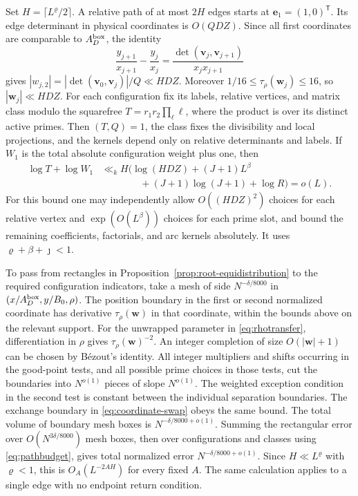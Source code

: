 \documentclass[11pt]{amsart}
\numberwithin{equation}{section}
\theoremstyle{remark}
\begin{document}
Set $H=\lceil L^\varrho/2\rceil$. A relative path of at most $2H$
edges starts at $\mathbf e_1=(1,0)^{\mathsf T}$. Its edge determinant
in physical coordinates is $O(QDZ)$. Since all first coordinates
are comparable to $A_D^{\rm box}$, the identity
\[
 \frac{y_{j+1}}{x_{j+1}}-\frac{y_j}{x_j}
 =\frac{\det(\mathbf v_j,\mathbf v_{j+1})}{x_jx_{j+1}}
\]
gives $|w_{j,2}|=|\det(\mathbf v_0,\mathbf v_j)|/Q\ll HDZ$.
Moreover $1/16\le\tau_\rho(\mathbf w_j)\le16$, so
$|\mathbf w_j|\ll HDZ$. For each configuration fix its labels,
relative vertices, and matrix class modulo the squarefree
$T=r_1r_2\prod_\ell\ell$, where the product is over its distinct
active primes. Then $(T,Q)=1$, the class fixes the divisibility and
local projections, and the kernels depend only on relative
determinants and labels. If $W_1$ is the total absolute configuration
weight plus one, then
\begin{equation}\label{eq:pathbudget}
 \begin{split}
 \log T+\log W_1 &\ll_k H\bigl(\log(HDZ)+(J+1)L^\beta \\
     &\hspace{4em} +(J+1)\log(J+1)+\log R\bigr)=o(L).
 \end{split}
\end{equation}
For this bound one may independently allow $O((HDZ)^2)$ choices for
each relative vertex and $\exp(O(L^\beta))$ choices for each prime
slot, and bound the remaining coefficients, factorials, and arc
kernels absolutely. It uses $\varrho+\beta+\jmath<1$.

To pass from rectangles in Proposition~\ref{prop:root-equidistribution}
to the required configuration indicators, take a mesh of side
$N^{-\delta/8000}$ in $(x/A_D^{\rm box},y/B_0,\rho)$. The position
boundary in the first or second normalized coordinate has derivative
$\tau_\rho(\mathbf w)$ in that coordinate, within the bounds above on
the relevant support. For the unwrapped parameter in
\eqref{eq:rhotransfer}, differentiation in $\rho$ gives
$\tau_\rho(\mathbf w)^{-2}$. An integer completion of size
$O(|\mathbf w|+1)$ can be chosen by B\'ezout's identity. All
integer multipliers and shifts occurring in the good-point tests,
and all possible prime choices in those tests, cut the boundaries
into $N^{o(1)}$ pieces of slope $N^{o(1)}$. The weighted exception
condition in the second test is constant between the individual
separation boundaries. The exchange boundary in
\eqref{eq:coordinate-swap} obeys the same bound. The total volume of
boundary mesh boxes is $N^{-\delta/8000+o(1)}$. Summing the rectangular
error over $O(N^{3\delta/8000})$ mesh boxes, then over configurations
and classes using \eqref{eq:pathbudget}, gives total normalized error
$N^{-\delta/8000+o(1)}$. Since $H\ll L^\varrho$ with $\varrho<1$, this
is $O_A(L^{-2AH})$ for every fixed $A$. The same calculation applies
to a single edge with no endpoint return condition.
\end{document}
